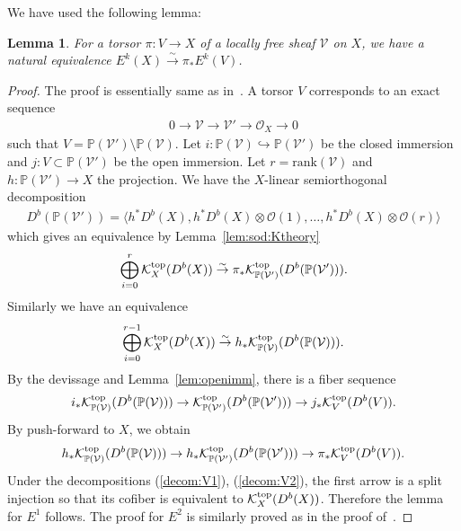 \documentclass [11pt,oneside,a4paper,mathscr]{amsart}
\newtheorem{lemma}[thm]{Lemma}
\theoremstyle{definition}
\begin{document}
We have used the following lemma: 
\begin{lemma}\label{lem:Kdecompose}
For a torsor $\pi \colon V \to X$ of a locally free sheaf $\mathcal{V}$ on $X$, 
we have a natural equivalence $E^k(X) \stackrel{\sim}{\to} \pi_{*}E^k(V)$.
\end{lemma}
\begin{proof}
    The proof is essentially same as in~\cite[Lemma~2.2, Lemma~2.6]{HLP}. 
    A torsor $V$ corresponds to an exact sequence 
    \begin{align*}
        0\to \mathcal{V} \to \mathcal{V}' \to \mathcal{O}_X \to 0
    \end{align*}
    such that $V=\mathbb{P}(\mathcal{V}') \setminus \mathbb{P}(\mathcal{V})$.
Let $i \colon \mathbb{P}(\mathcal{V}) \hookrightarrow \mathbb{P}(\mathcal{V}')$ be the 
closed immersion and $j \colon V
\subset \mathbb{P}(\mathcal{V}')$ be the open immersion. 
    Let $r=\mathrm{rank}(\mathcal{V})$ and $h\colon \mathbb{P}(\mathcal{V}') \to X$ the projection. 
    We have the $X$-linear semiorthogonal decomposition 
    \begin{align*}
        D^b(\mathbb{P}(\mathcal{V}'))=\langle h^* D^b(X), h^* D^b(X)\otimes \mathcal{O}(1), \ldots, h^* D^b(X) \otimes \mathcal{O}(r) \rangle
    \end{align*}
which gives an equivalence by Lemma~\ref{lem:sod:Ktheory}
\begin{align}\label{decom:V1}
\bigoplus_{i=0}^r \mathcal{K}_X^{\rm{top}}(D^b(X)) \stackrel{\sim}{\to}
\pi_{*}\mathcal{K}^{\rm{top}}_{\mathbb{P}(\mathcal{V}')}(D^b(\mathbb{P}(\mathcal{V}'))).
\end{align}
   Similarly we have an equivalence 
   \begin{align}\label{decom:V2}
\bigoplus_{i=0}^{r-1} \mathcal{K}_X^{\rm{top}}(D^b(X)) \stackrel{\sim}{\to}
h_{*}\mathcal{K}^{\rm{top}}_{\mathbb{P}(\mathcal{V})}(D^b(\mathbb{P}(\mathcal{V}))).
   \end{align}
By the devissage and Lemma~\ref{lem:openimm}, there is a fiber sequence
\begin{align*}
    i_{*}\mathcal{K}^{\rm{top}}_{\mathbb{P}(\mathcal{V})}(D^b(\mathbb{P}(\mathcal{V})))
    \to \mathcal{K}^{\rm{top}}_{\mathbb{P}(\mathcal{V}')}(D^b(\mathbb{P}(\mathcal{V}')))
    \to j_{*}\mathcal{K}^{\rm{top}}_{V}(D^b(V)). 
\end{align*}
By push-forward to $X$, we obtain
\begin{align*}
    h_{*}\mathcal{K}^{\rm{top}}_{\mathbb{P}(\mathcal{V})}(D^b(\mathbb{P}(\mathcal{V})))
    \to h_{*}\mathcal{K}^{\rm{top}}_{\mathbb{P}(\mathcal{V}')}(D^b(\mathbb{P}(\mathcal{V}')))
\to \pi_{*}\mathcal{K}^{\rm{top}}_V(D^b(V)). 
\end{align*}
Under the decompositions (\ref{decom:V1}), (\ref{decom:V2}), the first arrow is a split 
injection so that its cofiber is equivalent to $\mathcal{K}_X^{\rm{top}}(D^b(X))$.
Therefore the lemma for $E^1$ follows. The proof for $E^2$ is similarly proved as in 
the proof of~\cite[Lemma~2.6]{HLP}.
\end{proof}
\end{document}
